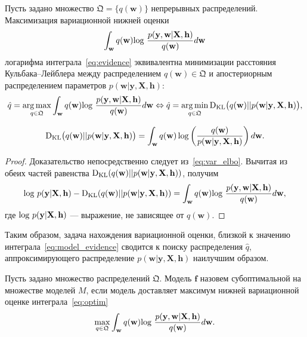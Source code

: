 \begin{theorem}\label{st:st1} Пусть задано множество $\mathfrak{Q} = \{q(\mathbf{w})\}$ непрерывных распределений. Максимизация вариационной нижней оценки $$\int_{\mathbf{w}} q(\mathbf{w})\textnormal{log}~\frac{p(\mathbf{y},\mathbf{w}|\mathbf{X},\mathbf{h})}{q(\mathbf{w})}d\mathbf{w}$$  логарифма интеграла~\eqref{eq:evidence}  эквивалентна минимизации расстояния Кульбака--Лейблера между распределением $q(\mathbf{w}) \in \mathfrak{Q}$ и апостериорным распределением параметров $p(\mathbf{w}|\mathbf{y}, \mathbf{X}, \mathbf{h})$:
\begin{equation}
\label{eq:optim}
    \hat{q} = \operatorname*{arg\,max}_{q \in \mathfrak{Q}} \int_{\mathbf{w}} q(\mathbf{w})\textnormal{log}~\frac{p(\mathbf{y},\mathbf{w}|\mathbf{X},\mathbf{h})}{q(\mathbf{w})}d\mathbf{w} \Leftrightarrow 	
    \hat{q} = \operatorname*{arg\,min}_{q \in  \mathfrak{Q}} \textnormal{D}_\textnormal{KL}  \bigl(q(\mathbf{w})||p(\mathbf{w}|\mathbf{y}, \mathbf{X}, \mathbf{h})\bigr),
\end{equation}

\[
	\textnormal{D}_\textnormal{KL}  \bigl(q(\mathbf{w})||p(\mathbf{w}|\mathbf{y}, \mathbf{X}, \mathbf{h})\bigr) =  \int_\mathbf{w} q(\mathbf{w}) \log \left(\frac{q(\mathbf{w})}{p(\mathbf{w}|\mathbf{y}, \mathbf{X}, \mathbf{h})}\right) d\mathbf{w}.
\]

\end{theorem}
\begin{proof}
Доказательство непосредственно следует из~\eqref{eq:var_elbo}. Вычитая из обеих частей равенства $\textnormal{D}_\textnormal{KL}  (q(\mathbf{w})||p(\mathbf{w}|\mathbf{y}, \mathbf{X}, \mathbf{h}))$, получим
\[
\textnormal{log}~p(\mathbf{y}|\mathbf{X},\mathbf{h}) - \textnormal{D}_\textnormal{KL}  (q(\mathbf{w})||p(\mathbf{w}|\mathbf{y}, \mathbf{X}, \mathbf{h}))  = \int_{\mathbf{w}} q(\mathbf{w})\textnormal{log}~\frac{p(\mathbf{y},\mathbf{w}|\mathbf{X},\mathbf{h})}{q(\mathbf{w})}d\mathbf{w},
\]
где $\textnormal{log}~p(\mathbf{y}|\mathbf{X},\mathbf{h})$ --- выражение, не зависящее от $q(\mathbf{w})$.
\end{proof}



Таким образом, задача нахождения вариационной оценки, близкой к значению интеграла~\eqref{eq:model_evidence} сводится к поиску распределения $\hat{q}$, аппроксимирующего распределение $p(\mathbf{w}|\mathbf{y}, \mathbf{X}, \mathbf{h})$ наилучшим образом. 

\begin{defin} Пусть задано множество распределений $\mathfrak{Q}$. Модель $\mathbf{f}$ назовем субоптимальной на множестве моделей $M$, если модель доставляет максимум нижней вариационной оценке интеграла~\eqref{eq:optim}
\begin{equation}
\label{eq:var_elbo2}
	\max_{q \in \mathfrak{Q}}\int_{\mathbf{w}} q(\mathbf{w})\textnormal{log}~\frac{p(\mathbf{y},\mathbf{w}|\mathbf{X},\mathbf{h})}{q(\mathbf{w})}d\mathbf{w}.
\end{equation}
\end{defin}

